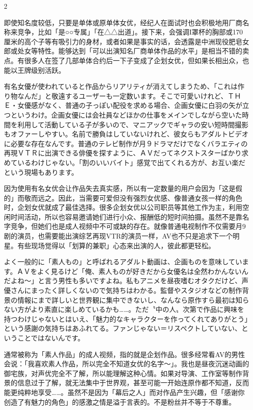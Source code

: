 \documentclass[12pt,UTF8]{ctexbook}
\begin{document}
\begin{paracol}{2}
\switchcolumn

即使知名度较低，只要是单体或原单体女优，经纪人在面试时也会积极地用厂商名称来竞争，比如「是○○专属」「在△△出道」。接下来，会强调I罩杯的胸部或170厘米的高个子等有吸引力的身材，或者如果是事实的话，会透露是中洲现役肥皂女郎或处女等特性。能够达到「可以出演知名厂商单体作品的水平」是相当不错的卖点。有很多人在签了几部单体合约后一下子变成了企划女优，但如果长相出众，也能以王牌级别活跃。

\switchcolumn*

有名女優が使われていると作品からリアリティが消えてしまうため、「これは作り物なんだ」と敬遠するユーザーも一定数います。そこで可愛いけれど、ＴＨＥ・女優感がなく、普通の子っぽい配役を求める場合、企画女優に白羽の矢が立つというわけ。企画女優には会社員などほかの仕事をメインでしながら空いた時間を利用して活動している子が多いので、マニアックでギャラの安い短時間撮影もオファーしやすい。名前で勝負はしていないけれど、彼女らもアダルトビデオに必要な存在なんです。普通のテレビ制作が月９ドラマだけでなくバラエティの再現ＶＴＲに出演できる俳優を探すように、ＡＶだってネクストスターばかり求めているわけじゃない。「割のいいバイト」感覚で出てくれる方が、お互い楽だという現場もあります。

\switchcolumn

因为使用有名女优会让作品失去真实感，所以有一定数量的用户会因为「这是假的」而敬而远之。因此，当需要可爱但没有强烈女优感、像普通女孩一样的角色时，企划女优就成了最佳选择。很多企划女优以公司职员等其他工作为主，利用空闲时间活动，所以也容易邀请她们进行小众、报酬低的短时间拍摄。虽然不是靠名字竞争，但她们也是成人视频中不可或缺的存在。就像普通电视制作不仅需要月9剧的演员，也需要能出演综艺再现VTR的演员一样，AV也不只是追求下一个明星。有些现场觉得以「划算的兼职」心态来出演的人，彼此都更轻松。

\switchcolumn*

よく一般的に「素人もの」と呼ばれるアダルト動画は、企画ものを意味しています。ＡＶをよく見るけど「俺、素人ものが好きだから女優名は全然わかんないんだよね〜」と言う男性も多いですよね。私もアニメを昼夜嗜むオタクだけど、声優さんにまったく詳しくないので気持ちはわかる。監督やスタジオなどの制作背景の情報にまで詳しいと世界観に集中できないし、なんなら原作すら最初は知らない方がより素直に楽しめているかも……。ただ〝中の人〟次第で作品に興味を持つわけじゃないとはいえ、「魅力的なキャラクターを作ってくれてありがとう」という感謝の気持ちはあふれてる。ファンじゃない＝リスペクトしていない、ということではないんです。

\switchcolumn

通常被称为「素人作品」的成人视频，指的就是企划作品。很多经常看AV的男性会说：「我喜欢素人作品，所以完全不知道女优的名字〜」。我也是昼夜沉迷动画的御宅族，对声优完全不了解，所以能理解这种心情。如果对导演、工作室等制作背景的信息过于了解，就无法集中于世界观，甚至可能一开始连原作都不知道，反而能更纯粹地享受……。虽然不是因为「幕后之人」而对作品产生兴趣，但「感谢你创造了有魅力的角色」的感激之情是溢于言表的。不是粉丝并不等于不尊重。


\end{paracol}
\end{document}
